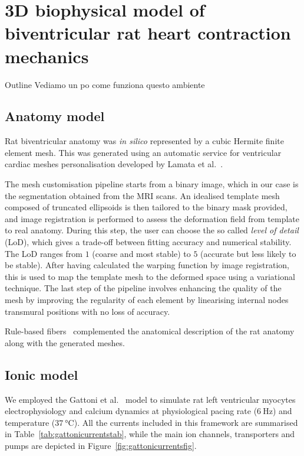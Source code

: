 \chapter{3D biophysical model of biventricular rat heart contraction 
mechanics}\label{cha:chapter2}
%
%
%
\begin{remark}{Outline}
    Vediamo un po come funziona questo ambiente
\end{remark}


%
%
%
\section{Anatomy model}\label{sec:ch2anatomy}
Rat biventricular anatomy was \textit{in silico} represented by a cubic Hermite finite element mesh. This was generated using an automatic service for ventricular cardiac meshes personalisation developed by Lamata et al.~\cite{Lamata:2011, Lamata:2014}.

\vspace{0.2cm}
The mesh customisation pipeline starts from a binary image, which in our case is the segmentation obtained from the MRI scans. An idealised template mesh composed of truncated ellipsoids is then tailored to the binary mask provided, and image registration is performed to assess the deformation field from template to real anatomy. During this step, the user can choose the so called \textit{level of detail} (\acs{LoD}), which gives a trade-off between fitting accuracy and numerical stability. The LoD ranges from $1$ (coarse and most stable) to $5$ (accurate but less likely to be stable). After having calculated the warping function by image registration, this is used to map the template mesh to the deformed space using a variational technique. The last step of the pipeline involves enhancing the quality of the mesh by improving the regularity of each element by linearising internal nodes transmural positions with no loss of accuracy.

\vspace{0.2cm}
Rule-based fibers~\cite{Bayer:2012} complemented the anatomical description of the rat anatomy along with the generated meshes.


%
%
%
\section{Ionic model}\label{sec:ionicmodel}
We employed the Gattoni et al.~\cite{Gattoni:2016} model to simulate rat left ventricular myocytes electrophysiology and calcium dynamics at physiological pacing rate ($\SI{6}{\hertz}$) and temperature ($\SI{37}{\celsius}$). All the currents included in this framework are summarised in Table~\ref{tab:gattonicurrentstab}, while the main ion channels, transporters and pumps are depicted in Figure~\ref{fig:gattonicurrentsfig}.

